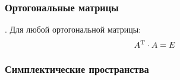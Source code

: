 \subsubsection{\xmark Ортогональные матрицы}

\noindent
\socrat. Для любой ортогональной матрицы:
\begin{equation}
    A^{\text{T}} \cdot A = E
\end{equation} 

\subsubsection{\xmark Симплектические пространства}




